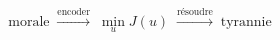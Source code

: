 \documentclass[preview]{standalone}
\begin{document}
\begin{align*}
\text{morale} \;\xrightarrow{\text{encoder}}\; \min_u J(u) \;\xrightarrow{\text{résoudre}}\; \text{tyrannie}
\end{align*}
\end{document}
